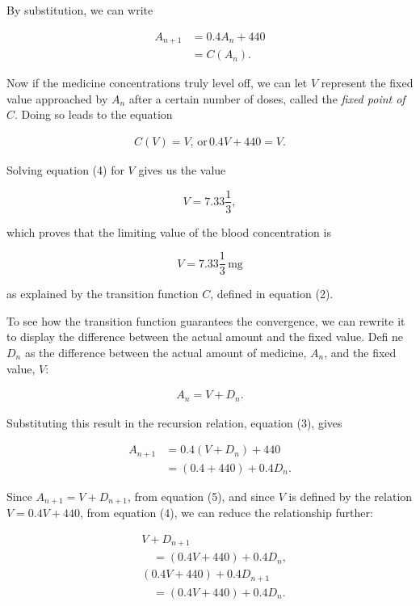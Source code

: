 \documentclass[
  10pt,
  a4paper,
  landscape,
  twoside,
  openany
]{scrbook}
\begin{document}
{\begin{description}
  By substitution, we can write

  \begin{align*}
    A_{n+1}
      &=0.4A_n+440 \\
      &=C(A_n). \tag{3}
  \end{align*} 

  Now if the medicine concentrations truly level off, we can let $V$ represent the fixed value approached by $A_n$ after a certain number of doses, called the \emph{fixed point of} $C$. Doing so leads to the equation

    \begin{align*}
      C(V)=V, \, \text{or} \, 0.4V+440=V. \tag{4}
    \end{align*} 

  Solving equation (4) for $V$ gives us the value

  $$
    V=7.33\frac{1}{3},
  $$

  which proves that the limiting value of the blood concentration is

  $$
    V=7.33\frac{1}{3} \, \text{mg}
  $$

  as explained by the transition function $C$, defined in equation (2).

  To see how the transition function guarantees the convergence, we can rewrite it to display the difference between the actual amount and the fixed value. Defi ne $D_n$ as the difference between the actual amount of medicine, $A_n$, and the fixed value, $V$:

    \begin{align*}
      A_n=V+D_n. \tag{5}
    \end{align*} 

  Substituting this result in the recursion relation, equation (3), gives

  \begin{align*}
    A_{n+1}
      &=0.4(V+D_n)+440\\
      &=(0.4+440)+0.4D_n. \tag{6}
  \end{align*} 

  Since $A_{n+1} = V + D_{n+1}$, from equation (5), and since $V$ is defined by the relation $V = 0.4V + 440$, from equation (4), we can reduce the relationship further:

  \begin{align*}
    &V+D_{n+1} \\
    &\quad =(0.4V+440)+0.4D_n, \\
    & (0.4V+440)+0.4D_{n+1} \\
    &\quad =(0.4V+440)+0.4D_n.  
  \end{align*}


\end{description}}
\end{document}
